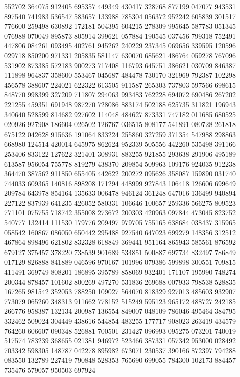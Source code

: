 {552702 364075 912405 695357 449349 430417 328768 877199 047077 943531 897540%
741983 536547 583657 133988 785304 056372 952242 605839 301517 776600 259498%
630892 172181 504395 604215 278309 995645 587783 051345 076988 070049 895873%
805914 399621 057884 190545 037456 799318 752491 447806 084261 093495 402761%
945262 240229 237345 069656 339595 120596 029718 850200 971331 205835 581147%
630070 685621 486764 059278 767096 531902 873385 572183 900273 717408 116793%
645751 386621 030709 846387 111898 964837 358600 553467 045687 484478 730170%
321969 792387 102298 456578 388607 224021 622322 613505 911587 265303 737803%
597566 698615 848770 998399 327209 711807 294063 993483 762228 694072 690486%
267202 221255 459351 691948 987270 728086 883174 502188 625735 311821 196943%
340640 528599 814682 927602 114048 484627 873331 747182 011685 680525 020926%
927908 186604 026502 126767 036515 808177 541891 080728 261818 675122 042628%
915636 191064 833224 255860 327259 371354 547988 298863 668980 124514 420014%
645975 862624 952339 505556 442260 535498 391166 253406 833122 127622 321401%
308931 883255 921855 293638 291906 495189 613587 956054 755778 819279 438370%
209854 509963 109176 924035 912238 364470 387562 911850 655405 442622 200272%
095626 358087 159890 031740 744033 609365 140816 898208 171294 448999 927843%
106418 126606 699649 209784 643978 854164 135633 006478 946124 361248 647016%
136499 940894 227122 837939 641235 426052 580331 106646 100657 259336 566275%
809523 771101 075755 718742 355008 273672 200303 420963 097844 473045 823752%
540777 132414 111530 179776 209497 979705 755165 638684 038437 315965 058542%
160867 086050 650442 295488 927540 647023 699279 148356 312512 467864 898496%
621802 832328 618849 369441 951164 865943 585561 876592 679127 375457 378220%
738539 901689 534851 500887 697734 832497 786849 017129 826888 841889 046596%
970167 101996 079386 599898 300551 709815 411491 369749 808201 186895 395789%
858069 932401 171107 195990 748274 200344 878457 101602 800269 497270 531836%
269688 007933 798538 528835 167265 981542 352053 788250 109027 564070 818329%
927013 485603 932907 773079 065260 348313 911662 778152 515249 595123 965172%
488727 242185 266776 958387 132134 200987 136554 849007 048109 786046 495464%
384795 332462 509024 304449 438616 544854 483255 177717 908023 263419 434579%
764260 606607 090348 526881 700501 231427 096993 095275 073201 740019 517574%
783239 368655 021381 946972 523466 387331 057342 953000 028492 703342 598305%
148787 042278 895982 673071 230537 390166 872397 794288 083550 132789 227419%
790848 528353 765690 699055 784300 102173 884457 735476 579057 950503 697924%
}

